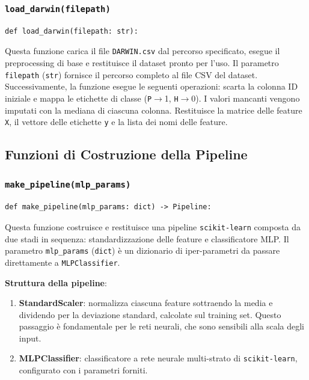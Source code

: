 \documentclass[11pt,a4paper]{article}
\begin{document}
\subsubsection{\texttt{load\_darwin(filepath)}}

\begin{lstlisting}
def load_darwin(filepath: str):
\end{lstlisting}

Questa funzione carica il file \texttt{DARWIN.csv} dal percorso specificato,
esegue il preprocessing di base e restituisce il dataset pronto per l'uso.
Il parametro \texttt{filepath} (\texttt{str}) fornisce il percorso completo al file CSV del dataset.
Successivamente, la funzione esegue le seguenti operazioni:
scarta la colonna ID iniziale e mappa le etichette di classe (\texttt{P}$\to$1, \texttt{H}$\to$0).
 I valori mancanti vengono imputati con la mediana di ciascuna colonna.
  Restituisce la matrice delle feature \texttt{X}, il vettore delle etichette \texttt{y} e la lista dei nomi delle feature.



\subsection{Funzioni di Costruzione della Pipeline}

\subsubsection{\texttt{make\_pipeline(mlp\_params)}}

\begin{lstlisting}
def make_pipeline(mlp_params: dict) -> Pipeline:
\end{lstlisting}

Questa funzione costruisce e restituisce una pipeline \texttt{scikit-learn}
composta da due stadi in sequenza: standardizzazione delle feature e
classificatore MLP.
Il parametro \texttt{mlp\_params} (\texttt{dict}) è un dizionario di iper-parametri
          da passare direttamente a \texttt{MLPClassifier}.


\textbf{Struttura della pipeline}:
\begin{enumerate}
    \item \textbf{StandardScaler}: normalizza ciascuna feature sottraendo la
          media e dividendo per la deviazione standard, calcolate sul training set.
          Questo passaggio è fondamentale per le reti neurali, che sono sensibili
          alla scala degli input.
    \item \textbf{MLPClassifier}: classificatore a rete neurale multi-strato
          di \texttt{scikit-learn}, configurato con i parametri forniti.
\end{enumerate}
\end{document}
